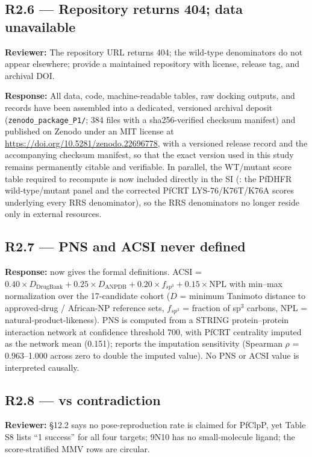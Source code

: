 \documentclass[11pt]{article}
\begin{document}
\subsection*{R2.6 --- Repository returns 404; data unavailable}
\textbf{Reviewer:} The repository URL returns 404; the wild-type denominators do not appear
elsewhere; provide a maintained repository with license, release tag, and archival DOI.

\textbf{Response:} All data, code, machine-readable tables, raw docking outputs, and
records have been assembled into a dedicated, versioned archival deposit
(\texttt{zenodo\_package\_P1/}; 384 files with a sha256-verified checksum manifest) and
published on Zenodo under an MIT license at \url{https://doi.org/10.5281/zenodo.22696778},
with a versioned release record and the accompanying checksum manifest, so that the exact 
version used in this study remains permanently citable and verifiable. In parallel, the 
WT/mutant score table required to recompute  is now included directly 
in the SI (: the
PfDHFR wild-type/mutant panel and the corrected PfCRT LYS-76/K76T/K76A scores underlying
every RRS denominator), so the RRS denominators no longer reside only in external resources.

\subsection*{R2.7 --- PNS and ACSI never defined}
\textbf{Response:}  now gives the formal definitions. ACSI =
$0.40\times D_{\mathrm{DrugBank}} + 0.25\times D_{\mathrm{ANPDB}} + 0.20\times f_{sp^3}
+ 0.15\times \mathrm{NPL}$ with min--max normalization over the 17-candidate cohort
($D$ = minimum Tanimoto distance to approved-drug / African-NP reference sets, $f_{sp^3}$ =
fraction of sp$^3$ carbons, NPL = natural-product-likeness). PNS is computed from a STRING
protein--protein interaction network at confidence threshold 700, with PfCRT centrality imputed
as the network mean (0.151);  reports the imputation sensitivity (Spearman
$\rho$ = 0.963--1.000 across zero to double the imputed value). No PNS or ACSI value is
interpreted causally.

\subsection*{R2.8 ---  vs  contradiction}
\textbf{Reviewer:} \S12.2 says no pose-reproduction rate is claimed for PfClpP, yet Table S8
lists ``1 success'' for all four targets; 9N10 has no small-molecule ligand; the score-stratified
MMV rows are circular.
\end{document}
